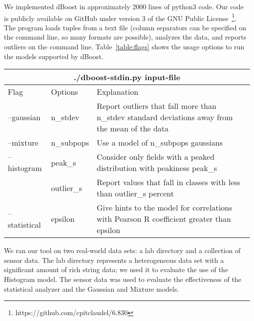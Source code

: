 
We implemented dBoost in approximately 2000 lines of python3 code.
Our code is publicly available on GitHub under version 3 of the GNU Public License~\footnote{https://github.com/cpitclaudel/6.830}.
The program loads tuples from a text file (column separators can be specified on the command line, so many formats are possible), analyzes the data, and reports outliers on the command line.
Table~\ref{table:flags} shows the usage options to run the models supported by dBoost.

\begin{table*}
\label{table:flags}
\caption{dBoost command line usage.}
\centering
\begin{tabular} {| l | l | p{10cm} |}
\hline
\multicolumn{3}{|c|}{./dboost-stdin.py input-file} \\
\hline
Flag & Options & Explanation \\
\hline
--gaussian & n\_stdev & Report outliers that fall more than n\_stdev standard deviations away from the mean of the data \\
--mixture & n\_subpops & Use a model of n\_subpops gaussians \\
--histogram & peak\_s & Consider only fields with a peaked distribution with peakiness peak\_s \\
  & outlier\_s & Report values that fall in classes with less than outlier\_s percent \\
--statistical & epsilon & Give hints to the model for correlations with Pearson R coefficient greater than epsilon \\
\hline
\end{tabular}
\end{table*}

We ran our tool on two real-world data sets: a lab directory and a collection of sensor data. The lab directory represents a heterogeneous data set with a significant amount of rich string data; we used it to evaluate the use of the Histogram model. The sensor data was used to evaluate the effectiveness of the statistical analyzer and the Gaussian and Mixture models.
